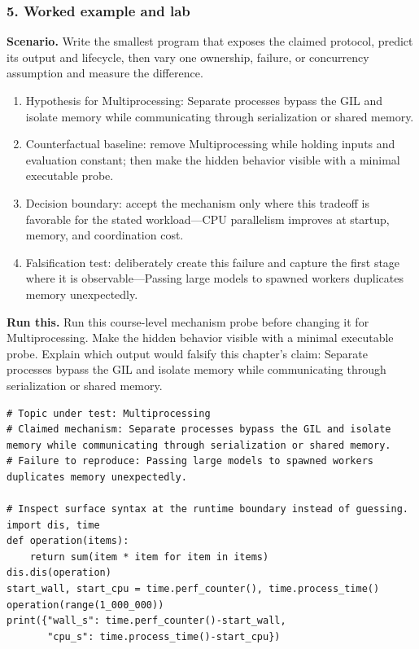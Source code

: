 \subsubsection*{5. Worked example and lab}
\textbf{Scenario.} Write the smallest program that exposes the claimed protocol, predict its output and lifecycle, then vary one ownership, failure, or concurrency assumption and measure the difference.
\begin{enumerate}
\item Hypothesis for Multiprocessing: Separate processes bypass the GIL and isolate memory while communicating through serialization or shared memory.
\item Counterfactual baseline: remove Multiprocessing while holding inputs and evaluation constant; then make the hidden behavior visible with a minimal executable probe.
\item Decision boundary: accept the mechanism only where this tradeoff is favorable for the stated workload—CPU parallelism improves at startup, memory, and coordination cost.
\item Falsification test: deliberately create this failure and capture the first stage where it is observable—Passing large models to spawned workers duplicates memory unexpectedly.
\end{enumerate}
\textbf{Run this.} Run this course-level mechanism probe before changing it for Multiprocessing. Make the hidden behavior visible with a minimal executable probe. Explain which output would falsify this chapter's claim: Separate processes bypass the GIL and isolate memory while communicating through serialization or shared memory.
\begin{Verbatim}[fontsize=\scriptsize]
# Topic under test: Multiprocessing
# Claimed mechanism: Separate processes bypass the GIL and isolate memory while communicating through serialization or shared memory.
# Failure to reproduce: Passing large models to spawned workers duplicates memory unexpectedly.

# Inspect surface syntax at the runtime boundary instead of guessing.
import dis, time
def operation(items):
    return sum(item * item for item in items)
dis.dis(operation)
start_wall, start_cpu = time.perf_counter(), time.process_time()
operation(range(1_000_000))
print({"wall_s": time.perf_counter()-start_wall,
       "cpu_s": time.process_time()-start_cpu})
\end{Verbatim}
